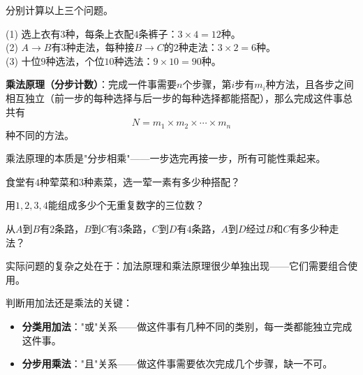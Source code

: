 \begin{example}
分别计算以上三个问题。
\end{example}
\begin{solution}
(1) 选上衣有$3$种，每条上衣配$4$条裤子：$3\times4=12$种。\\
(2) $A\to B$有$3$种走法，每种接$B\to C$的$2$种走法：$3\times2=6$种。\\
(3) 十位$9$种选法，个位$10$种选法：$9\times10=90$种。
\end{solution}

\textbf{乘法原理（分步计数）}：完成一件事需要$n$个步骤，第$i$步有$m_i$种方法，且各步之间相互独立（前一步的每种选择与后一步的每种选择都能搭配），那么完成这件事总共有
\[
N = m_1 \times m_2 \times \cdots \times m_n
\]
种不同的方法。

乘法原理的本质是"分步相乘"——一步选完再接一步，所有可能性乘起来。

\begin{center}
\end{center}

\begin{exercise}
\item 食堂有$4$种荤菜和$3$种素菜，选一荤一素有多少种搭配？
\item 用$1,2,3,4$能组成多少个无重复数字的三位数？
\item 从$A$到$B$有$2$条路，$B$到$C$有$3$条路，$C$到$D$有$4$条路，$A$到$D$经过$B$和$C$有多少种走法？
\end{exercise}


实际问题的复杂之处在于：加法原理和乘法原理很少单独出现——它们需要组合使用。

判断用加法还是乘法的关键：
\begin{itemize}
\item \textbf{分类用加法}："或"关系——做这件事有几种不同的类别，每一类都能独立完成这件事。
\item \textbf{分步用乘法}："且"关系——做这件事需要依次完成几个步骤，缺一不可。
\end{itemize}

